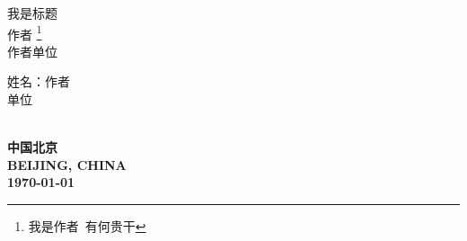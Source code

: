 \begin{titlepage}
\begin{center}
	{\heiti\Huge 我是标题}\\[30mm]
	{\large 作者 \footnote{我是作者\ 有何贵干}}\\[5mm]
	作者单位\\[15mm]
	\begin{minipage}[c]{200pt}
		\large 姓\qquad 名：作者\\
		单位\\
	\end{minipage}\\[100mm]
	\textbf{\heiti 中国\quad 北京\\ 
	BEIJING, CHINA\\
	\today}
\end{center}
\end{titlepage}

\restoregeometry%
